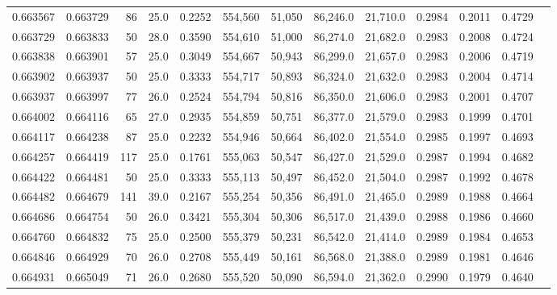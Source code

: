\begin{tabular}{rrrrrrrrrrrrr}
0.663567 & 0.663729 &    86 & 25.0 &                                     0.2252 & 554,560 &  51,050 &  86,246.0 &  21,710.0 & 0.2984 & 0.2011 & 0.4729 \\
0.663729 & 0.663833 &    50 & 28.0 &                                     0.3590 & 554,610 &  51,000 &  86,274.0 &  21,682.0 & 0.2983 & 0.2008 & 0.4724 \\
0.663838 & 0.663901 &    57 & 25.0 &                                     0.3049 & 554,667 &  50,943 &  86,299.0 &  21,657.0 & 0.2983 & 0.2006 & 0.4719 \\
0.663902 & 0.663937 &    50 & 25.0 &                                     0.3333 & 554,717 &  50,893 &  86,324.0 &  21,632.0 & 0.2983 & 0.2004 & 0.4714 \\
0.663937 & 0.663997 &    77 & 26.0 &                                     0.2524 & 554,794 &  50,816 &  86,350.0 &  21,606.0 & 0.2983 & 0.2001 & 0.4707 \\
0.664002 & 0.664116 &    65 & 27.0 &                                     0.2935 & 554,859 &  50,751 &  86,377.0 &  21,579.0 & 0.2983 & 0.1999 & 0.4701 \\
0.664117 & 0.664238 &    87 & 25.0 &                                     0.2232 & 554,946 &  50,664 &  86,402.0 &  21,554.0 & 0.2985 & 0.1997 & 0.4693 \\
0.664257 & 0.664419 &   117 & 25.0 &                                     0.1761 & 555,063 &  50,547 &  86,427.0 &  21,529.0 & 0.2987 & 0.1994 & 0.4682 \\
0.664422 & 0.664481 &    50 & 25.0 &                                     0.3333 & 555,113 &  50,497 &  86,452.0 &  21,504.0 & 0.2987 & 0.1992 & 0.4678 \\
0.664482 & 0.664679 &   141 & 39.0 &                                     0.2167 & 555,254 &  50,356 &  86,491.0 &  21,465.0 & 0.2989 & 0.1988 & 0.4664 \\
0.664686 & 0.664754 &    50 & 26.0 &                                     0.3421 & 555,304 &  50,306 &  86,517.0 &  21,439.0 & 0.2988 & 0.1986 & 0.4660 \\
0.664760 & 0.664832 &    75 & 25.0 &                                     0.2500 & 555,379 &  50,231 &  86,542.0 &  21,414.0 & 0.2989 & 0.1984 & 0.4653 \\
0.664846 & 0.664929 &    70 & 26.0 &                                     0.2708 & 555,449 &  50,161 &  86,568.0 &  21,388.0 & 0.2989 & 0.1981 & 0.4646 \\
0.664931 & 0.665049 &    71 & 26.0 &                                     0.2680 & 555,520 &  50,090 &  86,594.0 &  21,362.0 & 0.2990 & 0.1979 & 0.4640 \\

\end{tabular}
